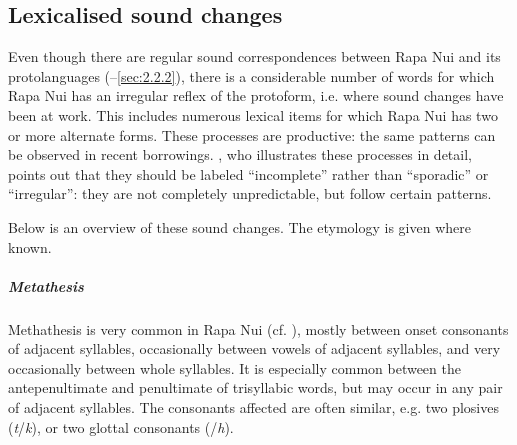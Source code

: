 \subsection{Lexicalised sound changes}\label{sec:2.5.2}

Even though there are regular sound correspondences between Rapa Nui and its protolanguages (–\ref{sec:2.2.2}), there is a considerable number of words for which Rapa Nui has an irregular reflex of the protoform, i.e. where sound changes have been at work. This includes numerous lexical items for which Rapa Nui has two or more alternate forms. These processes are productive: the same patterns can be observed in recent borrowings. \citet{Davletshin2015}, who illustrates these processes in detail, points out that they should be labeled “incomplete” rather than “sporadic” or “irregular”: they are not completely unpredictable, but follow certain patterns. 

Below is an overview of these sound changes. The etymology is given where known.

\subparagraph{Metathesis} Methathesis is very common in Rapa Nui (cf. \citealt[166]{DuFeuFischer1993}), mostly between onset consonants of adjacent syllables, occasionally between vowels of adjacent syllables, and very occasionally between whole syllables. It is especially common between the antepenultimate and penultimate  of trisyllabic words, but may occur in any pair of adjacent syllables. The consonants affected are often similar, e.g. two plosives (\textit{t}/\textit{k}), or two glottal consonants (\textit{{\ꞌ}}/\textit{h}).

